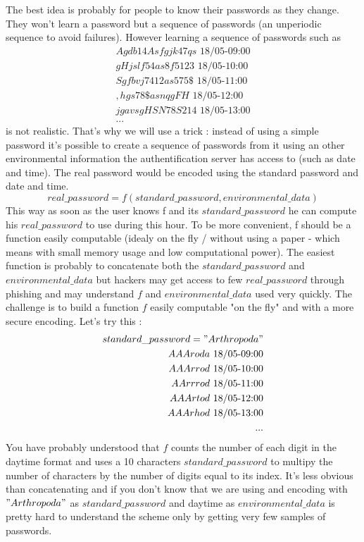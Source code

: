 \documentclass[11pt]{article}
\begin{document}
The best idea is probably for people to know their passwords as they change. They won't learn a password but a sequence of passwords (an unperiodic sequence to avoid failures). However learning a sequence of passwords such as 
\begin{equation}
\begin{split}
Agdb14Asfgjk47qs\mbox{ 18/05-09:00}\\
gHjslf54as8f5123\mbox{ 18/05-10:00}\\
Sgfbvj7412as575\$\mbox{ 18/05-11:00}\\
,hgs78\$asnqgFH\mbox{ 18/05-12:00}\\
jgavsgHSN78S214\mbox{ 18/05-13:00}\\
...
\end{split}
\end{equation}
is not realistic. That's why we will use a trick : instead of using a simple password it's possible to create a sequence of passwords from it using an other environmental information the authentification server has access to (such as date and time). The real password would be encoded using the standard password and date and time.
$$ real\_password = f(standard\_password,environmental\_data)$$
This way as soon as the user knows f and its $standard\_password$ he can compute his $real\_password$ to use during this hour. To be more convenient, f should be a function easily computable (idealy on the fly / without using a paper - which means with small memory usage and low computational power).
The easiest function is probably to concatenate both the $standard\_password$ and $environmental\_data$ but hackers may get access to few $real\_password$ through phishing and may understand $f$ and $environmental\_data$ used very quickly.
The challenge is to build a function $f$ easily computable "on the fly" and with a more secure encoding. Let's try this :\\
\begin{equation}
\begin{split}
\mbox{$standard\_password="Arthropoda"$}\\
AAAroda\mbox{ 18/05-09:00}\\
AAArrod\mbox{ 18/05-10:00}\\
AArrrod\mbox{ 18/05-11:00}\\
AAArtod\mbox{ 18/05-12:00}\\
AAArhod\mbox{ 18/05-13:00}\\
...
\end{split}
\end{equation}
You have probably understood that $f$ counts the number of each digit in the daytime format and uses a 10 characters $standard\_password$ to multipy the number of characters by the number of digits equal to its index. It's less obvious than concatenating and if you don't know that we are using and encoding with $"Arthropoda"$ as $standard\_password$ and daytime as $environmental\_data$ is pretty hard to understand the scheme only by getting very few samples of passwords.
\end{document}

